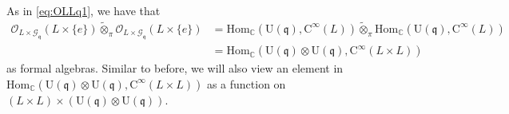 \documentclass[12pt, a4paper]{amsart}
\newcommand{\BC}{{\mathbb {C}}}
\newcommand{\CG}{{\mathcal {G}}}
\newcommand{\CO}{{\mathcal {O}}}
\newcommand{\RC}{{\mathrm {C}}}
\newcommand{\Ri}{{\mathrm{i}}}
\newcommand{\RU}{{\mathrm {U}}}
\newcommand{\Hom}{{\mathrm{Hom}}}
\newcommand{\wt}{\widetilde}
\newcommand{\wh}{\widehat}
\newcommand{\q}{\mathfrak q}
\newcommand{\be}{\begin {equation}}
\newcommand{\ee}{\end {equation}}
\theoremstyle{Theorem}
\theoremstyle{Theorem}
\theoremstyle{Theorem}
\theoremstyle{Theorem}
\theoremstyle{Plain}
\theoremstyle{remark}
\theoremstyle{remark}
\theoremstyle{Definition}
\numberwithin{equation}{section}
\begin{document}
 
 



As in \eqref{eq:OLLq1}, we  have 
that 
\[ \begin{aligned} \CO_{L\times \CG_{\q}}(L\times\{e\})\wt\otimes_{\pi} \CO_{L\times \CG_{\q}}(L\times \{e\})&=\Hom_{\BC}(\RU(\q),\RC^{\infty}(L))\wt\otimes_{\pi}\Hom_{\BC}(\RU(\q),\RC^{\infty}(L))\\ &=\Hom_{\BC}(\RU(\q)\otimes \RU(\q),\RC^{\infty}(L\times L))\end{aligned} \] as formal algebras. Similar to before, we will also view an element in 
$ \Hom_{\BC}(\RU(\q)\otimes \RU(\q),\RC^{\infty}(L\times L))$ as  a function on $(L\times L)\times (\RU(\q)\otimes \RU(\q))$.  

\end{document}
